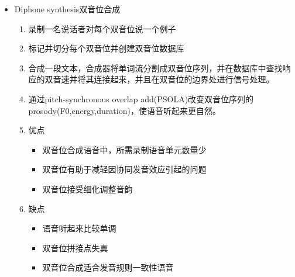 \documentclass[UTF8]{ctexart}
\begin{document}
\begin{itemize}
\begin{enumerate}
        \item diphones双音位的拼接
        \begin{itemize}
            \item 双音位是两个相邻的班音位：连接起来的位置从一个音位的中间沿伸到下一个音位的中间。
            \item 双音位的长度为一个音位长度
            \item 音位的中心位置是协同发音效果最显著的区域，是拼接波形的好位置。
        \end{itemize}

    \end{enumerate}

    \item Diphone synthesis双音位合成
    
    \begin{enumerate}
        \item 录制一名说话者对每个双音位说一个例子
        \item 标记并切分每个双音位并创建双音位数据库
        \item 合成一段文本，合成器将单词流分割成双音位序列，并在数据库中查找响应的双音速并将其连接起来，并且在双音位的边界处进行信号处理。
        \item 通过pitch-synchronous overlap add(PSOLA)改变双音位序列的prosody(F0,energy,duration)，使语音听起来更自然。
        \item 优点
        \begin{itemize}
            \item 双音位合成语音中，所需录制语音单元数量少
            \item 双音位有助于减轻因协同发音效应引起的问题
            \item 双音位接受细化调整音韵
        \end{itemize}
        \item 缺点
        \begin{itemize}
            \item 语音听起来比较单调
            \item 双音位拼接点失真
            \item 双音位合成适合发音规则一致性语音
        \end{itemize}
    \end{enumerate}


\end{itemize}
\end{document}
